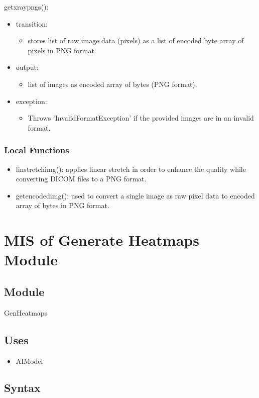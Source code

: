 \documentclass[12pt, titlepage]{article}
\begin{document}
\noindent getxraypngs():
\begin{itemize}
\item transition: \begin{itemize}
    \item stores list of raw image data (pixels) as a list of encoded byte array of pixels in PNG format.
\end{itemize}
\item output: \begin{itemize}
    \item list of images as encoded array of bytes (PNG format).
\end{itemize}
\item exception: \begin{itemize}
    \item Throws 'InvalidFormatException' if the provided images are in an invalid format.
\end{itemize}
\end{itemize}

\subsubsection{Local Functions}
\begin{itemize}
    \item linstretchimg(): applies linear stretch in order to enhance the quality while converting DICOM files to a PNG format.
    \item getencodedimg(): used to convert a single image as raw pixel data to encoded array of bytes in PNG format.
\end{itemize}
\newpage

\section{MIS of Generate Heatmaps Module} \label{Module} 
\subsection{Module}
GenHeatmaps
\subsection{Uses}
\begin{itemize}
    \item AIModel
\end{itemize}
\subsection{Syntax}
\end{document}
